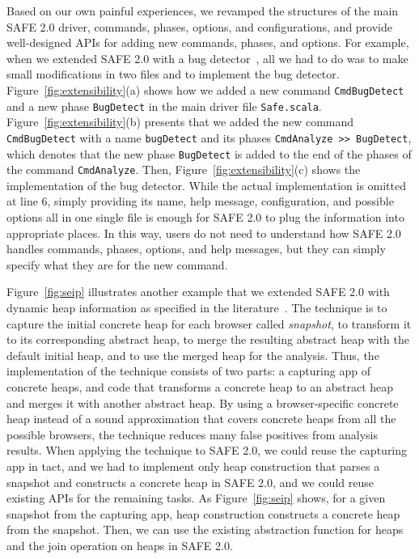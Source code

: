 \documentclass[10pt, conference]{IEEEtran}
\newcommand{\mtt}[1]{\texttt{\small #1}}
\newcommand{\msf}[1]{{\sf\small #1}}
\newcommand{\safe}{{SAFE 2.0}\xspace}
\begin{document}
Based on our own painful experiences, we revamped the structures of
the main \safe driver, commands, phases, options, and configurations,
and provide well-designed APIs for adding new commands, phases, and
options.  For example, when we extended \safe with a bug
detector~\cite{safewapp}, all we had to do was to make small
modifications in two files and to implement the bug detector.
Figure~\ref{fig:extensibility}(a) shows how we added a new command
\mtt{CmdBugDetect} and a new phase \mtt{BugDetect} in the main
driver file \mtt{Safe.scala}.  Figure~\ref{fig:extensibility}(b) presents
that we added the new command \mtt{CmdBugDetect} with a name
\mtt{bugDetect} and its phases \mtt{CmdAnalyze >> BugDetect},
which denotes that the new phase \mtt{BugDetect} is added to the end
of the phases of the command \mtt{CmdAnalyze}.  Then,
Figure~\ref{fig:extensibility}(c) shows the implementation of the
bug detector.  While the actual implementation is omitted at line 6,
simply providing its name, help message, configuration, and possible
options all in one single file is enough for \safe to plug the
information into appropriate places.  In this way, users do not
need to understand how \safe handles commands, phases, options, and
help messages, but they can simply specify what they are for the new
command.

Figure~\ref{fig:seip} illustrates another example that we extended \safe
with dynamic heap information as specified in the
literature~\cite{safehybrid}.  The technique is to capture the initial
concrete heap for each browser called \emph{snapshot}, to transform
it to its corresponding abstract heap, to merge the resulting
abstract heap with the default initial heap, and to use the merged heap
for the analysis.  Thus, the implementation of the technique consists
of two parts: a capturing app of concrete heaps, and code that
transforms a concrete heap to an abstract heap and merges it with another
abstract heap.  By using a browser-specific concrete heap
instead of a sound approximation that covers concrete heaps from
all the possible browsers, the technique reduces many false positives
from analysis results.  When applying the technique to \safe, we could
reuse the capturing app in tact, and we had to implement only 
\msf{heap construction} that parses a snapshot and constructs a concrete
heap in \safe, and we could reuse existing APIs for the remaining tasks.
As Figure~\ref{fig:seip} shows, for a given snapshot from the capturing
app, \msf{heap construction} constructs a concrete heap from the
snapshot.  Then, we can use the existing abstraction function for heaps
and the join operation on heaps in \safe.
\end{document}
